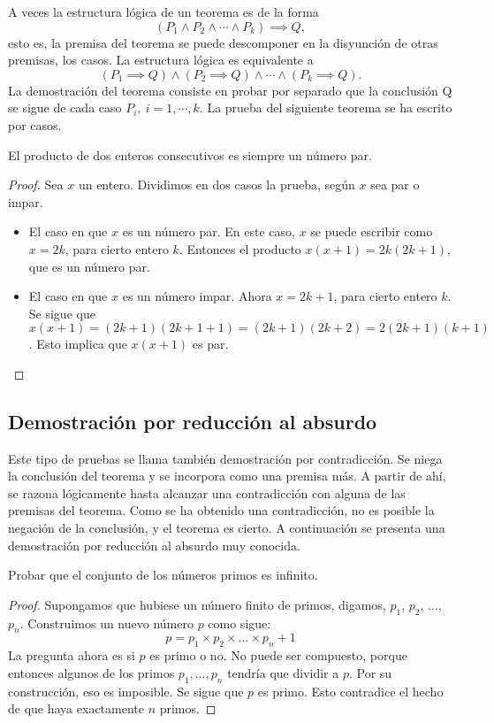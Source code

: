 A veces la estructura lógica de un teorema es de la forma
\[
    (P_1 \land P_2 \land \cdots \land P_k) \implies Q,
\]
esto es, la premisa del teorema se puede descomponer en la disyunción de otras premisas, los casos.
La estructura lógica es equivalente a
\[
    (P_1 \implies Q) \land (P_2 \implies Q) \land \cdots \land (P_k\implies Q).
\]
La demostración del teorema consiste en probar por separado que la conclusión Q se sigue de cada caso $P_i,\ i = 1, \cdots,k$.
La prueba del siguiente teorema se ha escrito por casos.
\begin{theorem}
    El producto de dos enteros consecutivos es siempre un número par.
\end{theorem}
\begin{proof}
    Sea $x$ un entero.
    Dividimos en dos casos la prueba, según $x$ sea par o impar.
    \begin{itemize}
        \item El caso en que $x$ es un número par.
        En este caso, $x$ se puede escribir como $x = 2k$, para cierto entero $k$.
        Entonces el producto $x(x + 1) = 2k(2k + 1)$, que es un número par.

        \item El caso en que $x$ es un número impar.
        Ahora $x = 2k + 1$, para cierto entero $k$.
        Se sigue que $x(x + 1) = (2k + 1)(2k + 1 + 1) = (2k + 1)(2k + 2) = 2(2k + 1)(k + 1)$.
        Esto implica que $x(x + 1)$ es par.\qedhere
    \end{itemize}
\end{proof}



\subsection{Demostración por reducción al absurdo}

Este tipo de pruebas se llama también demostración por contradicción.
Se niega la conclusión del teorema y se incorpora como una premisa más.
A partir de ahí, se razona lógicamente hasta alcanzar una contradicción con alguna de las premisas del teorema.
Como se ha obtenido una contradicción, no es posible la negación de la conclusión, y el teorema es cierto.
A continuación se presenta una demostración por reducción al absurdo muy conocida.
\begin{theorem}
    Probar que el conjunto de los números primos es infinito.
\end{theorem}
\begin{proof}
    Supongamos que hubiese un número finito de primos, digamos, $p_1$, $p_2$, $\ldots$, $p_n$.
    Construimos un nuevo número $p$ como sigue:
    \[
        p = p_1\times p_2 \times \ldots \times p_n + 1
    \]
    La pregunta ahora es si $p$ es primo o no.
    No puede ser compuesto, porque entonces algunos de los primos $p_1, \ldots, p_n$ tendría que dividir a $p$.
    Por su construcción, eso es imposible.
    Se sigue que $p$ es primo.
    Esto contradice el hecho de que haya exactamente $n$ primos.
\end{proof}




